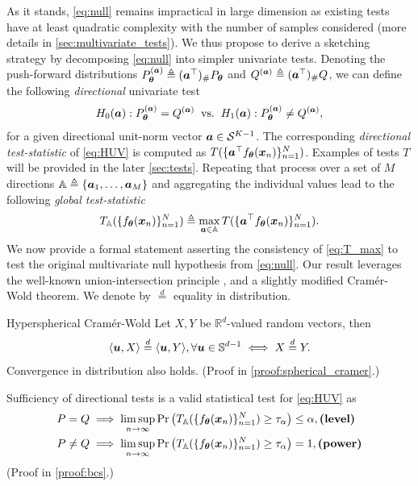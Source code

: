 As it stands, \cref{eq:null} remains impractical in large dimension as existing tests have at least quadratic complexity with the number of samples considered (more details in \cref{sec:multivariate_tests}). We thus propose to derive a sketching strategy by decomposing \cref{eq:null} into simpler univariate tests.
Denoting the push-forward distributions $P_{\bm{\theta}}^{({\bm{a}})}\triangleq ({\bm{a}}^\top)_\# P_{\bm{\theta}}$ and $Q^{({\bm{a}})}\triangleq ({\bm{a}}^\top)_\# Q$, we can define the following {\em directional} univariate test
\begin{align}
    H_0({\bm{a}}):  P_{\bm{\theta}}^{({\bm{a}})} = Q^{({\bm{a}})}\;\;\text{vs.} \;\; H_1({\bm{a}}): P_{\bm{\theta}}^{({\bm{a}})} \not = Q^{({\bm{a}})},   \label{eq:HUV}
\end{align}
for a given directional unit-norm vector ${\bm{a}} \in \mathcal{S}^{K-1}$. The corresponding \emph{directional test-statistic} of \cref{eq:HUV} is computed as $T(\{{\bm{a}}^\top f_{{\bm{\theta}}}({\bm{x}}_n)\}_{n=1}^N)$. Examples of tests $T$ will be provided in the later \cref{sec:tests}. Repeating that process over a set of $M$ directions ${\mathbb{A}}\triangleq \{ {\bm{a}}_1,\dots,{\bm{a}}_M\}$ and aggregating the individual values lead to the following \emph{global test-statistic}
\begin{align}
T_{{\mathbb{A}}}(\{f_{{\bm{\theta}}}({\bm{x}}_n)\}_{n=1}^N)\triangleq \max_{{\bm{a}} \in {\mathbb{A}}} T(\{{\bm{a}}^\top f_{{\bm{\theta}}}({\bm{x}}_n)\}_{n=1}^N).\label{eq:T_max}
\end{align}
We now provide a formal statement asserting the consistency of \cref{eq:T_max} to test the original multivariate null hypothesis from \cref{eq:null}. Our result leverages the well-known union-intersection principle \citep{roy1953heuristic}, and a slightly modified Cramér-Wold theorem. We denote by $\stackrel{d}{=}$ equality in distribution.

\begin{lemma}[label={thm:spherical_cramer}]{Hyperspherical Cramér-Wold}{}
Let $X,Y$ be $\mathbb{R}^d$-valued random vectors, then
\[
\langle {\bm{u}},X\rangle \stackrel{d}{=} \langle {\bm{u}},Y\rangle, \forall {\bm{u}} \in \mathbb{S}^{d-1}\iff X \stackrel{d}{=} Y.
\]
Convergence in distribution also holds. (Proof in \cref{proof:spherical_cramer}.)
\end{lemma}




\begin{theorem}[label={thm:bcs}]{Sufficiency of directional tests}{}
 is a valid statistical test for \cref{eq:HUV} as
\begin{align*}
P=Q&\implies\limsup_{n\to\infty}\Pr\left(T_{{\mathbb{A}}}(\{f_{{\bm{\theta}}}({\bm{x}}_n)\}_{n=1}^N) \ge \tau_\alpha\right)\le \alpha,\text{\bf (level)}
\\
P\neq Q& \implies\limsup_{n\to\infty}\Pr\left(T_{{\mathbb{A}}}(\{f_{{\bm{\theta}}}({\bm{x}}_n)\}_{n=1}^N) \ge \tau_\alpha\right)=1,\text{\bf (power)}
\end{align*}
(Proof in \cref{proof:bcs}.)
\end{theorem}

